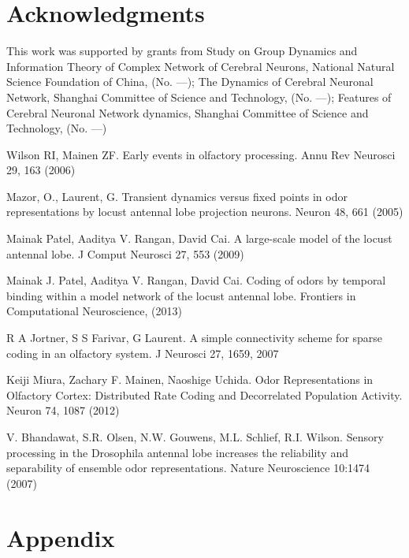 \documentclass[12pt, a4paper]{article}
\begin{document}
\section*{Acknowledgments}
This work was supported by grants from Study on Group Dynamics and Information Theory of Complex Network of Cerebral Neurons, National Natural Science Foundation of China, (No. ---); The Dynamics of Cerebral Neuronal Network, Shanghai Committee of Science and Technology, (No. ---); Features of Cerebral Neuronal Network dynamics, Shanghai Committee of Science and Technology, (No. ---) \cdots

\begin{thebibliography}{99} \scriptsize

Wilson RI, Mainen ZF. Early events in olfactory processing. Annu Rev Neurosci 29, 163 (2006)

Mazor, O., Laurent, G. Transient dynamics versus fixed points in odor representations by locust antennal lobe projection neurons. Neuron 48, 661 (2005)

Mainak Patel, Aaditya V. Rangan, David Cai. A large-scale model of the locust antennal lobe. J Comput Neurosci 27, 553 (2009)

Mainak J. Patel, Aaditya V. Rangan, David Cai. Coding of odors by temporal binding within a model network of the locust antennal lobe. Frontiers in Computational Neuroscience, (2013)

R A Jortner, S S Farivar, G Laurent. A simple connectivity scheme for sparse coding in an olfactory system. J Neurosci 27, 1659, 2007

Keiji Miura, Zachary F. Mainen, Naoshige Uchida. Odor Representations in Olfactory Cortex: Distributed Rate Coding and Decorrelated Population Activity. Neuron 74, 1087 (2012)

V. Bhandawat, S.R. Olsen, N.W. Gouwens, M.L. Schlief, R.I. Wilson. Sensory processing in the Drosophila antennal lobe increases the reliability and separability of ensemble odor representations. Nature Neuroscience 10:1474 (2007)



\end{thebibliography}

\newpage{}
\section*{Appendix} \label{Sect:appendix}
\end{document}
